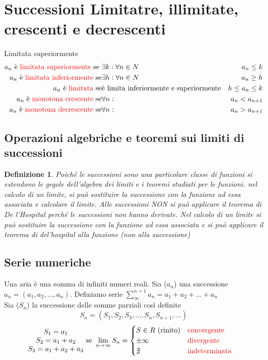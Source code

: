 \documentclass{book}
\newtheorem{defi}{Definizione}
\begin{document}
\section{Successioni Limitatre, illimitate, crescenti e decrescenti}
Limitata superiormente
\begin{eqnarray*}
  a_n \text{ è {\color{red} limitata superiormente} se } & \exists k:\forall n \in N
  & a_n\leq k\\
  a_n \text{ è {\color{red} limitata inferiormente} se} & \exists h: \forall n\in N
  & a_n \geq h\\
  a_n \text{ è {\color{red} limitata} se} & \text{è limita inferiormente e superiormente}
  & h\leq a_n\leq k\\
  a_n \text{ è {\color{red}monotona crescente} se} & \forall n: & a_n < a_{n+1}\\
  a_n \text{ è {\color{red}monotona decrescente} se} & \forall n: & a_n > a_{n+1}
\end{eqnarray*}
\clearpage
\subsection{Operazioni algebriche e teoremi sui limiti di successioni}
\begin{defi}
	Poiché le successioni sono una particolare classe di funzioni si estendono
	le gegole dell'algebra dei limiti e i teoremi studiati per le funzioni.
	nel calcolo di un limite, si può sostituire la successione con la funzione
	ad essa associata e calcolare il limite. Alle successioni {\color{red}NON}
	si può applicare il teorema di De l'Hospital perché le successioni non
	hanno derivate. Nel calcolo di un limite si può sostituire la successione
	con la funzione ad essa associata e si può applicare il teorema di
	del'hospital alla funzione (non alla successione)
\end{defi}
\subsection{Serie numeriche}
Una {\color{red}aria} è una somma di infiniti numeri reali. Sia ($a_n$) una
successione $a_n=(a_1,a_2, \dots,a_n)$. Definiamo {\color{red}serie
$\displaystyle\sum_{\infty}^{n=1}a_n=a_1+a_2+\dots+a_n$}\\
Sia ($S_n$) la successione delle somme parziali così definite
\begin{equation*}
	S_n=(S_1,S_2,S_3,\dots,S_n,S_{n+1},\dots)
\end{equation*}
\begin{eqnarray*}
	\begin{matrix}
		S_1=a_1\\
		S_2=a_1+a_2\\
		S_3=a_1+a_2+a_3
	\end{matrix} &\text{ se }\lim\limits_{n\to\infty}S_n=\begin{cases}
		S\in R\text{ (rinito)} & \text{\color{red}convergente}\\
		\pm \infty & \text{\color{red}divergente}\\
		\nexists &\text{\color{red}indeterminata}
	\end{cases}
\end{eqnarray*}
\end{document}
